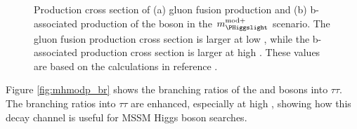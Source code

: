 \begin{figure}[h!]
\begin{center}
\end{center}
\caption[Production cross sections of  gluon fusion and b-associated
production of the \PHiggs boson in the $m_{\PHiggslight}^{\text{mod+}}$ scenario.]{Production cross section of (a) gluon fusion production and (b) b-associated production of the \PHiggs boson
in the $m_{\PHiggslight}^{\text{mod+}}$ scenario. The gluon fusion production cross section is larger at low \tanb, while
the b-associated production cross section is larger at high \tanb. These values are based on the
calculations in reference \cite{YR3}.}
\label{fig:mhmodp_xs}
\end{figure}

Figure \ref{fig:mhmodp_br} shows the branching ratios of the \PHiggs and \PHiggsps 
bosons into $\tau\tau$. The branching ratios into $\tau\tau$ are enhanced, especially at
high \tanb, showing how this decay channel is useful for MSSM Higgs boson searches.

